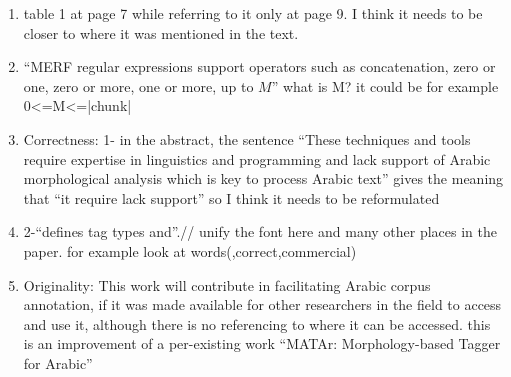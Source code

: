 \begin{enumerate}[leftmargin=0mm,label=\bfseries CommentR3.\arabic*]

\item \label{Review.3.25}
table 1 at page 7 while referring to it only at page 9. 
I think it needs to be closer to where it was mentioned in the text. 



\item \label{Review.3.25}
``MERF regular expressions support operators such as concatenation, zero or one, zero or more, one or more, up to $M$” what is M? 
it could be for example 0<=M<=|chunk| 




\item \label{Review.3.25}
Correctness: 
1- in the abstract, the sentence ``These techniques and 
tools require expertise in linguistics and programming and 
lack support of Arabic morphological analysis which is key to 
process Arabic text''
gives the meaning that ``it require lack support'' so I think it 
needs to be reformulated 



\item \label{Review.3.25}
2-``defines tag types and''.// unify the font here and 
many other places in the paper. 
for example look at words(,correct,commercial)


\item \label{Review.3.25}
Originality:  
This work will contribute in facilitating Arabic corpus 
annotation, if it was made available for other researchers in 
the field to access and use it, although there is no 
referencing to where it can be accessed. 
this is an improvement of a per-existing work ``MATAr: Morphology-based Tagger for Arabic''



\end{enumerate}

